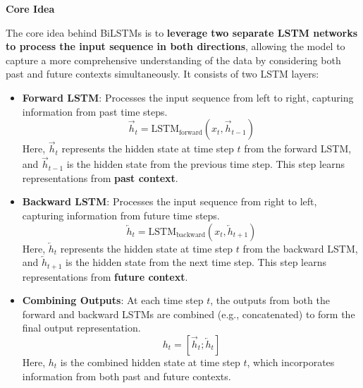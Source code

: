 \highspace
\begin{flushleft}
    \textcolor{Green3}{ \textbf{Core Idea}}
\end{flushleft}
The core idea behind BiLSTMs is to \textbf{leverage two separate LSTM networks to process the input sequence in both directions}, allowing the model to capture a more comprehensive understanding of the data by considering both past and future contexts simultaneously. It consists of two LSTM layers:
\begin{itemize}
    \item \textbf{Forward LSTM}: Processes the input sequence from left to right, capturing information from past time steps.
    \begin{equation*}
        \overrightarrow{h}_t = \text{LSTM}_{\text{forward}}(x_t, \overrightarrow{h}_{t-1})
    \end{equation*}
    Here, \(\overrightarrow{h}_t\) represents the hidden state at time step \(t\) from the forward LSTM, and \(\overrightarrow{h}_{t-1}\) is the hidden state from the previous time step. This step learns representations from \textbf{past context}.
    
    \item \textbf{Backward LSTM}: Processes the input sequence from right to left, capturing information from future time steps.
    \begin{equation*}
        \overleftarrow{h}_t = \text{LSTM}_{\text{backward}}(x_t, \overleftarrow{h}_{t+1})
    \end{equation*}
    Here, \(\overleftarrow{h}_t\) represents the hidden state at time step \(t\) from the backward LSTM, and \(\overleftarrow{h}_{t+1}\) is the hidden state from the next time step. This step learns representations from \textbf{future context}.
    
    \item \textbf{Combining Outputs}: At each time step \(t\), the outputs from both the forward and backward LSTMs are combined (e.g., concatenated) to form the final output representation.
    \begin{equation*}
        h_t = [\overrightarrow{h}_t; \overleftarrow{h}_t]
    \end{equation*}
    Here, \(h_t\) is the combined hidden state at time step \(t\), which incorporates information from both past and future contexts.
\end{itemize}

